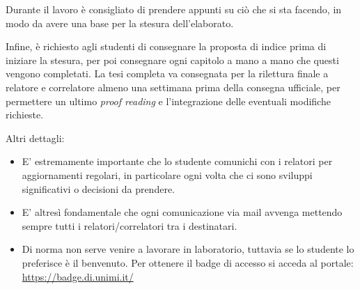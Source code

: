\documentclass[12pt]{report}
\begin{document}
Durante il lavoro è consigliato di prendere appunti su ciò che si sta facendo, in modo da avere una base per la stesura dell'elaborato.

Infine, è richiesto agli studenti di consegnare la proposta di indice prima di iniziare la stesura, per poi consegnare ogni capitolo a mano a mano che questi vengono completati. La tesi completa va consegnata per la rilettura finale a relatore e correlatore almeno una settimana prima della consegna ufficiale, per permettere un ultimo \textit{proof reading} e l'integrazione delle eventuali modifiche richieste.

Altri dettagli:
\begin{itemize}
    \item E' estremamente importante che lo studente comunichi con i relatori per aggiornamenti regolari, in particolare ogni volta che ci sono sviluppi significativi o decisioni da prendere.
    \item E' altresì fondamentale che ogni comunicazione via mail avvenga mettendo sempre tutti i relatori/correlatori tra i destinatari.
    \item Di norma non serve venire a lavorare in laboratorio, tuttavia se lo studente lo preferisce è il benvenuto. Per ottenere il badge di accesso si acceda al portale: \url{https://badge.di.unimi.it/}
\end{itemize}
\end{document}
